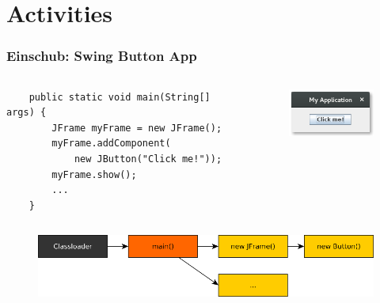 \section{Activities}

\begin{frame}[c,fragile]
	\frametitle{Einschub: Swing Button App}
	\begin{columns}
	\begin{lstlisting}
	public static void main(String[] args) {
	    JFrame myFrame = new JFrame();
	    myFrame.addComponent(
	        new JButton("Click me!"));
	    myFrame.show();
	    ...
	}
	\end{lstlisting}

	\pause
	\vspace{1cm}
	\begin{figure}
	\includegraphics[width=3cm]{pictures/activities/button-swing.png}
	\end{figure}
	\end{columns}

	\pause \vspace{0.5cm}
	\begin{figure}
	\includegraphics[width=\textwidth]{pictures/activities/call-hierachy-swing.png}
	\end{figure}
\end{frame}


